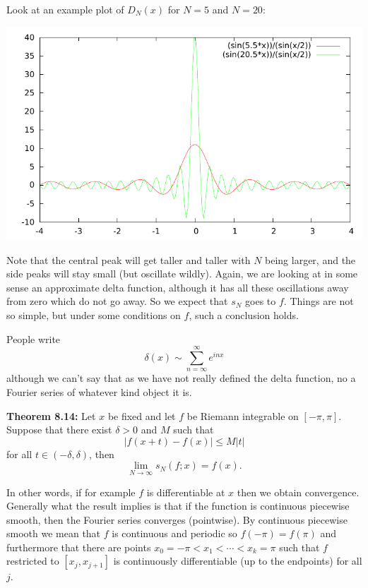 \documentclass[12pt]{book}
\newcommand{\abs}[1]{\left\lvert {#1} \right\rvert}
\theoremstyle{plain}
\theoremstyle{remark}
\theoremstyle{definition}
\theoremstyle{exercise}
\theoremstyle{example}
\begin{document}
Look at an example plot of $D_N(x)$ for $N=5$ and $N=20$:
\begin{center}
\includegraphics{figures/dirich.pdf}
\end{center}

Note that the central peak will get taller and taller with $N$ being larger,
and the side peaks will stay small (but oscillate wildly).
Again, we are looking at in some sense an approximate delta function,
although it has
all these oscillations away from zero which do not go away.  So we expect that
$s_N$ goes to $f$.  Things are not so simple, but under some conditions on
$f$, such a conclusion holds.

People write
$$
\delta(x) \sim \sum_{n=\infty}^\infty e^{inx}
$$
although we can't say that as
we have not really defined the delta function, no a Fourier series of
whatever kind object it is.


\medskip

\textbf{Theorem 8.14:}
Let $x$ be fixed and let $f$ be Riemann integrable on $[-\pi,\pi]$.  Suppose that there exist $\delta > 0$ and $M$ such that
$$
\abs{f(x+t)-f(x)} \leq M \abs{t}
$$
for all $t \in (-\delta,\delta)$, then
$$
\lim_{N \to \infty} s_N(f;x) = f(x) .
$$

\medskip

In other words, if for example $f$ is differentiable at $x$
then we obtain convergence.  Generally what the result implies is
that if the function is continuous
piecewise smooth, then the Fourier series converges
(pointwise).   By continuous piecewise smooth we mean that $f$
is continuous and periodic so $f(-\pi) = f(\pi)$ and furthermore
that there are points $x_0 = -\pi < x_1 < \cdots < x_k = \pi$
such that $f$ restricted to $[x_j,x_{j+1}]$
is continuously differentiable (up to the endpoints) for all $j$.
\end{document}
